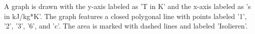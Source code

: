 A graph is drawn with the y-axis labeled as 'T in K' and the x-axis labeled as 's in kJ/kg*K'. The graph features a closed polygonal line with points labeled '1', '2', '3', '6', and 'c'. The area is marked with dashed lines and labeled 'Isolieren'.